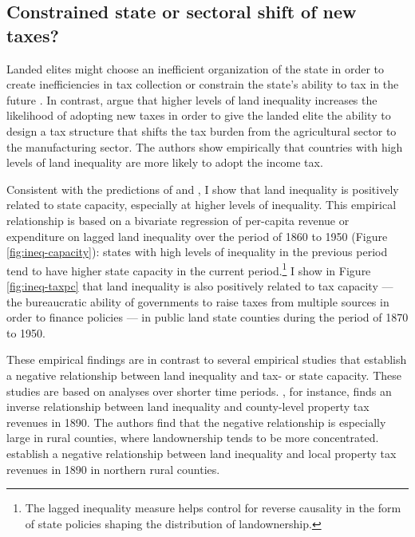 \subsection{Constrained state or sectoral shift of new taxes?}
	
Landed elites might choose an inefficient organization of the state in order to create inefficiencies in tax collection \citep{acemoglu2011emergence} or constrain the state's ability to tax in the future \citep{suryanarayan2017hollowing}. In contrast, \citet{mares2015non} argue that higher levels of land inequality increases the likelihood of adopting new taxes in order to give the landed elite the ability to design a tax structure that shifts the tax burden from the agricultural sector to the manufacturing sector. The authors show empirically that countries with high levels of land inequality are more likely to adopt the income tax. 

Consistent with the predictions of \citet{mares2015non} and \citet{meltzer1981rational}, I show that land inequality is positively related to state capacity, especially at higher levels of inequality. This empirical relationship is based on a bivariate regression of per-capita revenue or expenditure on lagged land inequality over the period of 1860 to 1950 (Figure \ref{fig:ineq-capacity}): states with high levels of inequality in the previous period tend to have higher state capacity in the current period.\footnote{The lagged inequality measure helps control for reverse causality in the form of state policies shaping the distribution of landownership.} I show in Figure \ref{fig:ineq-taxpc} that land inequality is also positively related to tax capacity --- the bureaucratic ability of governments to raise taxes from multiple sources in order to finance policies --- in public land state counties during the period of 1870 to 1950.

These empirical findings are in contrast to several empirical studies that establish a negative relationship between land inequality and tax- or state capacity. These studies are based on analyses over shorter time periods. \citet{ramcharan2010inequality}, for instance, finds an inverse relationship between land inequality and county-level property tax revenues in 1890. The authors find that the negative relationship is especially large in rural counties, where landownership tends to be more concentrated. \citet{vollrath2013inequality} establish a negative relationship between land inequality and local property tax revenues in 1890 in northern rural counties. 

